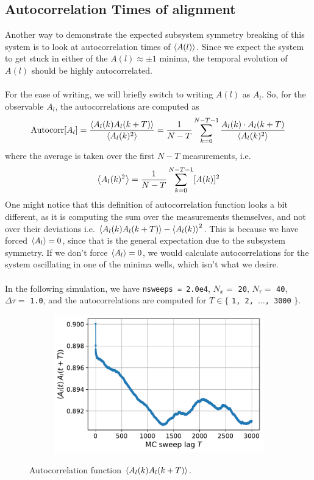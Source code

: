 \documentclass[../journal_main.tex]{subfiles}
\begin{document}
\subsection{Autocorrelation Times of alignment}
Another way to demonstrate the expected subsystem symmetry breaking of this system is to look at autocorrelation times of $\expval{A(l)}$. Since we expect the system to get stuck in either of the $A(l) \approx \pm 1$ minima, the temporal evolution of $A(l)$ should be highly autocorrelated.~\\~\\
For the ease of writing, we will briefly switch to writing $A(l)$ as $A_l$. So, for the observable $A_l$, the autocorrelations are computed as 
\begin{equation}
    \text{Autocorr}[A_l] = \frac{\expval{A_l(k) A_l(k+T)}}{\expval{A_l(k)^2}} = \frac{1}{N-T} \sum_{k=0}^{N-T-1} \frac{A_l(k) \cdot A_l(k+T)}{\expval{A_l(k)^2}}
\end{equation} 
where the average is taken over the first $N-T$ measurements, i.e.
\[
    \expval{A_l(k)^2} = \frac{1}{N-T} \sum_{k=0}^{N-T-1} [A(k)]^2
\] 
One might notice that this definition of autocorrelation function looks a bit different, as it is computing the sum over the measurements themselves, and not over their deviations i.e. $\expval{A_l(k) A_l(k+T)} - \expval{A_l(k)}^2$. This is because we have forced $\expval{A_l} = 0$, since that is the general expectation due to the subsystem symmetry. If we don't force $\expval{A_l} = 0$, we would calculate autocorrelations for the system oscillating in one of the minima wells, which isn't what we desire.~\\~\\
In the following simulation, we have \texttt{nsweeps = 2.0e4}, $N_x = $ \texttt{20}, $N_\tau = $ \texttt{40}, $\Delta \tau = $ \texttt{1.0}, and the autocorrelations are computed for $T \in \{ $ \texttt{1, 2, $\ldots$, 3000} $\}$.       

\begin{figure}[!htb]
    \centering
    \begin{subfigure}[b]{0.5\textwidth}
        \centering
        \includegraphics[width=\textwidth]{images/misc/autocorrfn_singlet.pdf}
    \end{subfigure}
    \caption{Autocorrelation function $\expval{A_l(k) A_l(k+T)}$.}
    \label{autocorrs_singlet}
\end{figure}
\FloatBarrier
\end{document}

